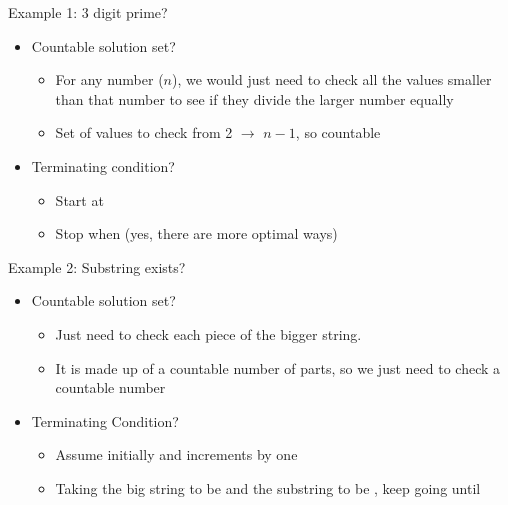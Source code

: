 \documentclass[pdf, aspectratio=169, 12pt]{beamer}
\begin{document}
\begin{frame}{Example 1: 3 digit prime?}
	\begin{itemize}
		\item Countable solution set?
			\begin{itemize}
				\item For any number ($n$), we would just need to check all the values smaller than that number to see if they divide the larger number equally
				\item Set of values to check from 2 $\rightarrow$ $n-1$, so countable
			\end{itemize}
		\item Terminating condition?
			\begin{itemize}
				\item Start at 
				\item Stop when  (yes, there are more optimal ways)
			\end{itemize}
	\end{itemize}
\end{frame}

\begin{frame}{Example 2: Substring exists?}
	\begin{itemize}
		\item Countable solution set?
			\begin{itemize}
				\item Just need to check each piece of the bigger string.
				\item It is made up of a countable number of parts, so we just need to check a countable number
			\end{itemize}
		\item Terminating Condition?
			\begin{itemize}
				\item Assume  initially and increments by one
				\item Taking the big string to be  and the substring to be , keep going until
					\begin{center}
					\end{center}
			\end{itemize}
	\end{itemize}
\end{frame}
\end{document}
